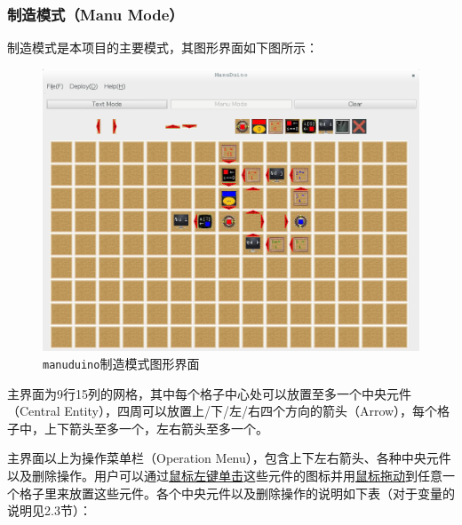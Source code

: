\documentclass[UTF8]{ctexart}
\begin{document}
\subsubsection{制造模式（Manu Mode）}
制造模式是本项目的主要模式，其图形界面如下图所示：\par
\begin{figure}[htb]
	\centering \includegraphics[scale=0.5]{1.png} \par
	\caption{\texttt{manuduino}制造模式图形界面}
\end{figure}
主界面为9行15列的网格，其中每个格子中心处可以放置至多一个中央元件（Central Entity），四周可以放置上/下/左/右四个方向的箭头（Arrow），每个格子中，上下箭头至多一个，左右箭头至多一个。\par
主界面以上为操作菜单栏（Operation Menu），包含上下左右箭头、各种中央元件以及删除操作。用户可以通过\uline{鼠标左键单击}这些元件的图标并用\uline{鼠标拖动}到任意一个格子里来放置这些元件。各个中央元件以及删除操作的说明如下表（对于变量的说明见2.3节）：\par \vspace*{1ex}
\end{document}
